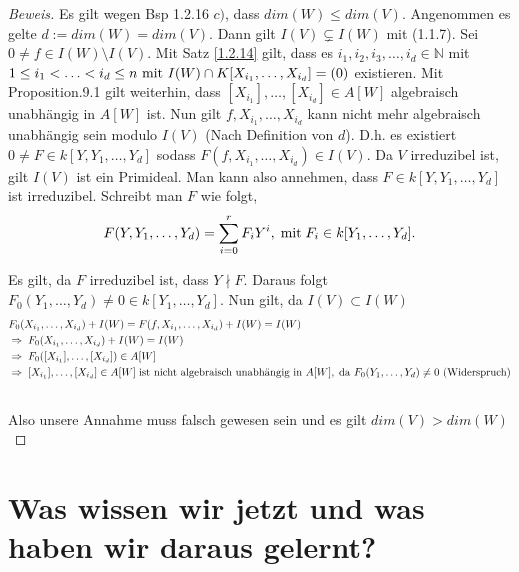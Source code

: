 \documentclass{article}
\newcommand*{\indx}[2]{{#1}_{#2}}
\newcommand*{\potx}[2]{{#1}^{#2}}
\newcommand*{\dkette}[2]{${#1}_1,{#1}_2,{#1}_3,\ldots,{#1}_{#2} \in \mathbb{N}$}
\begin{document}
\begin{proof}[Beweis]
	Es gilt wegen Bsp 1.2.16 $c)$, dass $dim(W)\leq dim(V)$. Angenommen es gelte $d:=dim(W)=dim(V)$. Dann gilt $I(V)\subsetneq I(W)$ mit (1.1.7). Sei $0\neq f\in I(W)\setminus I(V)$. Mit Satz \ref{1.2.14} gilt, dass es \dkette{i}{d} mit $ 1\leq\indx{i}{1}<\ldots<\indx{i}{d}\leq n \textnormal{ mit } I(W)\cap K[\indx{X}{\indx{i}{1}},\ldots,\indx{X}{\indx{i}{d}}]=(0)$ existieren. Mit Proposition.9.1 gilt weiterhin, dass $[\indx{X}{\indx{i}{1}}],\ldots,[\indx{X}{\indx{i}{d}}] \in A[W]$ algebraisch unabhängig in $A[W]$ ist. Nun gilt $f,\indx{X}{\indx{i}{1}},\ldots,\indx{X}{\indx{i}{d}}$ kann nicht mehr algebraisch unabhängig sein  modulo $I(V)$ (Nach Definition von $d$).
	D.h. es existiert $0\neq F\in k[Y,\indx{Y}{1},\ldots,\indx{Y}{d}]$ sodass $F(f,\indx{X}{\indx{i}{1}},\ldots,\indx{X}{\indx{i}{d}})\in I(V)$. Da $V$ irreduzibel ist, gilt $I(V)$ ist ein Primideal. Man kann also annehmen, dass $F\in k[Y,\indx{Y}{1},\ldots,\indx{Y}{d}]$ ist irreduzibel.
Schreibt man $F$ wie folgt, 
	\begin{displaymath}
	F(Y,\indx{Y}{1},\ldots,\indx{Y}{d})=\sum_{i=0}^{r}\indx{F}{i}\potx{Y}{i},\; \textnormal{mit}\;  \indx{F}{i}\in k[\indx{Y}{1},\ldots,\indx{Y}{d}].
	\end{displaymath}
	
	Es gilt, da $F$ irreduzibel ist, dass $Y\nmid F$. Daraus folgt $\indx{F}{0}(\indx{Y}{1},\ldots,\indx{Y}{d})\neq0 \in k[\indx{Y}{1},\ldots,\indx{Y}{d}]$. Nun gilt, da $I(V)\subset I(W)$ 
	\begin{align*}
&\indx{F}{0}(\indx{X}{\indx{i}{1}},\ldots,\indx{X}{\indx{i}{d}})+I(W)=F(f,\indx{X}{\indx{i}{1}},\ldots,\indx{X}{\indx{i}{d}})+I(W)=I(W)\\&
\Rightarrow \; \indx{F}{0}(\indx{X}{\indx{i}{1}},\ldots,\indx{X}{\indx{i}{d}})+I(W)=I(W)\\&
\Rightarrow \; \indx{F}{0}([\indx{X}{\indx{i}{1}}],\ldots,[\indx{X}{\indx{i}{d}}]) \in A[W]\\&
\Rightarrow\; [\indx{X}{\indx{i}{1}}],\ldots,[\indx{X}{\indx{i}{d}}]\in A[W]\; \textnormal{ist nicht algebraisch unabhängig in }A[W],\;\textnormal{da $\indx{F}{0}(\indx{Y}{1},\ldots,\indx{Y}{d})\neq0$ (Widerspruch)}\\& 
	\end{align*}
	
	Also unsere Annahme muss falsch gewesen sein und es gilt $dim(V)>dim(W)$
\end{proof}


\section{Was wissen wir jetzt und was haben wir daraus gelernt?}
\end{document}

